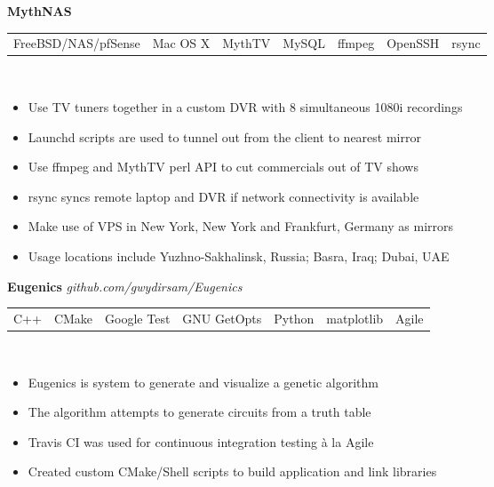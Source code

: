 \documentclass[margin,line,12pt]{res}
\begin{document}
{\begin{resume}
{\bf MythNAS} \
\\
\begin{tabular}{l l l l l l l}
  FreeBSD/NAS/pfSense & Mac OS X & MythTV & MySQL & ffmpeg & OpenSSH & rsync
\end{tabular}
\\
\vspace{-.16in}
\begin{itemize}
  \item Use TV tuners together in a custom DVR with 8 simultaneous 1080i recordings
  \item Launchd scripts are used to tunnel out from the client to nearest mirror
  \item Use ffmpeg and MythTV perl API to cut commercials out of TV shows
  \item rsync syncs remote laptop and DVR if network connectivity is available
  \item Make use of VPS in New York, New York and Frankfurt, Germany as mirrors
  \item Usage locations include Yuzhno-Sakhalinsk, Russia; Basra, Iraq; Dubai, UAE
\end{itemize}
\vspace{-.10in}

{\bf Eugenics } {\em github.com/gwydirsam/Eugenics }  \
\\
\begin{tabular}{l l l l l l l} 
  C++ & CMake & Google Test & GNU GetOpts & Python & matplotlib & Agile
\end{tabular}
\\
\vspace{-.16in}
\begin{itemize}
  \item Eugenics is system to generate and visualize a genetic algorithm
  \item The algorithm attempts to generate circuits from a truth table
  \item Travis CI was used for continuous integration testing \`{a} la Agile
  \item Created custom CMake/Shell scripts to build application and link libraries
\end{itemize}
\vspace{-.10in}


\end{resume}}
\end{document}
